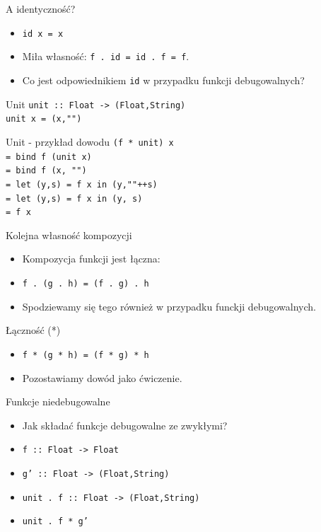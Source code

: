 \documentclass[14pt]{beamer}
\begin{document}
\begin{frame}{A identyczność?}
    \begin{itemize}
        \item \texttt{id x = x}
        \item Miła własność: \texttt{f . id = id . f = f}.
        \item Co jest odpowiednikiem \texttt{id} w przypadku
            funkcji debugowalnych?
    \end{itemize}
\end{frame}

\begin{frame}{Unit}
    \texttt{unit :: Float -> (Float,String)\\
    unit x = (x,"")}
\end{frame}

\begin{frame}{Unit - przykład dowodu}
    \texttt{(f * unit) x\\
        = bind f (unit x)\\
        = bind f (x, "")\\
        = let (y,s) = f x in (y,""++s)\\
        = let (y,s) = f x in (y, s)\\
        = f x
    }
\end{frame}

\begin{frame}{Kolejna własność kompozycji}
    \begin{itemize}
        \item Kompozycja funkcji jest łączna:
        \item \texttt{f . (g . h) = (f . g) . h}
        \item Spodziewamy się tego również w przypadku funckji debugowalnych.
    \end{itemize}
\end{frame}

\begin{frame}{Łączność (*)}
    \begin{itemize}
        \item \texttt{f * (g * h) = (f * g) * h}
        \pause
        \item Pozostawiamy dowód jako ćwiczenie.
    \end{itemize}
\end{frame}

\begin{frame}{Funkcje niedebugowalne}
    \begin{itemize}
        \item Jak składać funkcje debugowalne ze zwykłymi?
        \item \texttt{f  :: Float -> Float}
        \item \texttt{g' :: Float -> (Float,String)}
        \pause
        \item \texttt{unit . f :: Float -> (Float,String)}
        \item \texttt{unit . f * g'}
    \end{itemize}
\end{frame}
\end{document}
